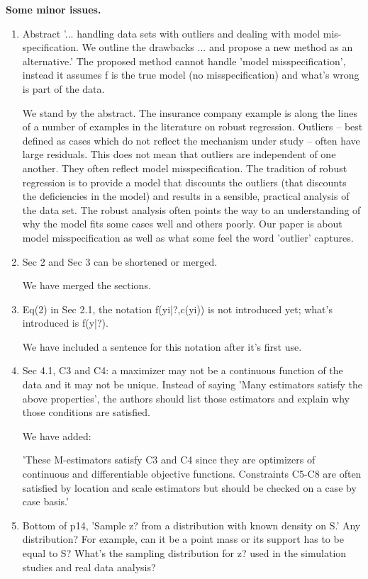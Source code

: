 \documentclass{article}
\newcommand{\response}[1]{{\color{blue}#1}}
\begin{document}
\textbf{Some minor issues.}
\begin{enumerate}
\item  Abstract '... handling data sets with outliers and dealing with model mis- specification. We outline the drawbacks ... and propose a new method as an alternative.' The proposed method cannot handle 'model misspecification', instead it assumes f is the true model (no misspecification) and what's wrong is part of the data.

\response{We stand by the abstract.  The insurance company example is along the lines of a number of examples in the literature on robust regression.  Outliers -- best defined as cases which do not reflect the mechanism under study -- often have large residuals.  This does not mean that outliers are independent of one another.  They often reflect model misspecification.  The tradition of robust regression is to provide a model that discounts the outliers (that discounts the deficiencies in the model) and results in a sensible, practical analysis of the data set.  The robust analysis often points the way to an understanding of why the model fits some cases well and others poorly.  Our paper is about model misspecification as well as what some feel the word 'outlier' captures.}  

\item  Sec 2 and Sec 3 can be shortened or merged.

\response{We have merged the sections.}

\item  Eq(2) in Sec 2.1, the notation f(yi|?,c(yi)) is not introduced yet; what's introduced is f(y|?).

\response{We have included a sentence for this notation after it's first use.}
 
\item  Sec 4.1, C3 and C4: a maximizer may not be a continuous function of the data and it may not be unique. Instead of saying 'Many estimators satisfy the above properties', the authors should list those estimators and explain why those conditions are satisfied.

\response{We have added:

\response{'These M-estimators satisfy C3 and C4 since they are optimizers of continuous and differentiable objective functions. Constraints C5-C8 are often satisfied by location and scale estimators but should be checked on a case by case basis.'}
}


\item  Bottom of p14, 'Sample z? from a distribution with known density on S.' Any distribution? For example, can it be a point mass or its support has to be equal to S? What's the sampling distribution for z? used in the simulation studies and real data analysis?


\end{enumerate}
\end{document}
